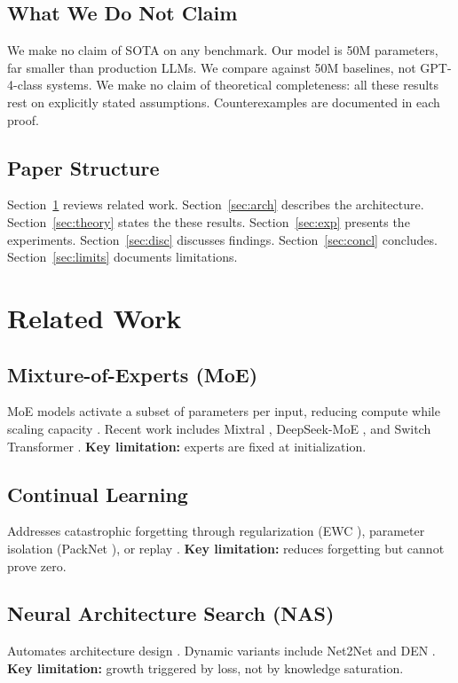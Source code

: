 \documentclass[11pt,a4paper]{article}
\begin{document}
\subsection{What We Do Not Claim}

We make no claim of SOTA on any benchmark. Our model is 50M
parameters, far smaller than production LLMs. We compare
against 50M baselines, not GPT-4-class systems. We make no
claim of theoretical completeness: all these results rest on
explicitly stated assumptions. Counterexamples are documented
in each proof.

\subsection{Paper Structure}

Section~\ref{sec:related} reviews related work.
Section~\ref{sec:arch} describes the architecture.
Section~\ref{sec:theory} states the these results.
Section~\ref{sec:exp} presents the experiments.
Section~\ref{sec:disc} discusses findings.
Section~\ref{sec:concl} concludes.
Section~\ref{sec:limits} documents limitations.

\section{Related Work}
\label{sec:related}

\subsection{Mixture-of-Experts (MoE)}
MoE models activate a subset of parameters per input, reducing
compute while scaling capacity \cite{jacobs1991,shazeer2017,fedus2022}.
Recent work includes Mixtral \cite{jiang2024}, DeepSeek-MoE
\cite{dai2024}, and Switch Transformer \cite{fedus2022}.
\textbf{Key limitation:} experts are fixed at initialization.

\subsection{Continual Learning}
Addresses catastrophic forgetting through regularization
(EWC \cite{kirkpatrick2017}), parameter isolation
(PackNet \cite{mallya2018}), or replay \cite{lopezpaz2017}.
\textbf{Key limitation:} reduces forgetting but cannot prove
zero.

\subsection{Neural Architecture Search (NAS)}
Automates architecture design \cite{zoph2017,elsken2019}.
Dynamic variants include Net2Net \cite{chen2016} and DEN
\cite{yoon2018}. \textbf{Key limitation:} growth triggered by
loss, not by knowledge saturation.
\end{document}
